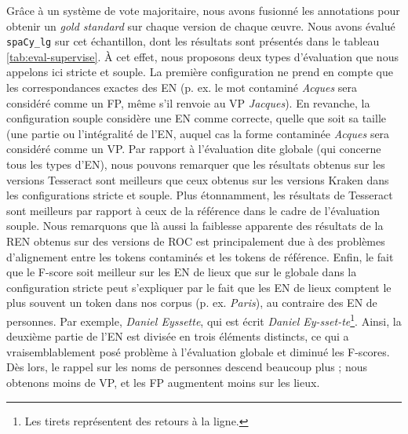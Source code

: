 Grâce à un système de vote majoritaire, nous avons fusionné les annotations pour obtenir un \textit{gold standard} sur chaque version de chaque œuvre.
 Nous avons évalué \texttt{spaCy\_lg} sur cet échantillon, dont les résultats sont présentés dans le tableau \ref{tab:eval-supervise}. À cet effet, nous proposons deux types d'évaluation que nous appelons ici \og{}stricte\fg{} et \og{}souple\fg{}. La première configuration ne prend en compte que les correspondances exactes des EN (p. ex. le mot contaminé \textit{Acques} sera considéré comme un FP, même s'il renvoie au VP \textit{Jacques}). En revanche, la configuration \og{}souple\fg{} considère une EN comme correcte, quelle que soit sa taille (une partie ou l'intégralité de l'EN, auquel cas la forme contaminée \textit{Acques} sera considéré comme un VP. Par rapport à l'évaluation dite \og{}globale\fg{} (qui concerne tous les types d'EN), nous pouvons remarquer que les résultats obtenus sur les versions Tesseract sont meilleurs que ceux obtenus sur les versions Kraken dans les configurations stricte et souple.
  Plus étonnamment, les résultats de Tesseract sont meilleurs par rapport à ceux de la référence dans le cadre de l'évaluation souple.
 Nous remarquons que là aussi la faiblesse apparente des résultats de la REN obtenus sur des versions de ROC est principalement due à des problèmes d'alignement entre les tokens contaminés et les tokens de référence. 
  Enfin, le fait que le F-score soit meilleur sur les EN de lieux que sur le globale dans la configuration stricte peut s'expliquer par le fait que les EN de lieux comptent le plus souvent un token dans nos corpus (p. ex. \textit{Paris}), au contraire des EN de personnes. Par exemple, \textit{Daniel Eyssette}, qui est écrit \textit{Daniel Ey-sset-te}\footnote{Les tirets représentent des retours à la ligne.}. Ainsi, la deuxième partie de l'EN est divisée en trois éléments distincts, ce qui a vraisemblablement posé problème à l'évaluation globale et diminué les F-scores. Dès lors, le rappel sur les noms de personnes descend beaucoup plus ; nous obtenons moins de VP, et les FP augmentent moins sur les lieux.
